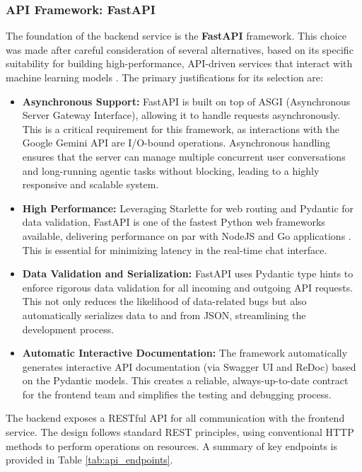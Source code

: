 \subsubsection{API Framework: FastAPI}
\label{sec:api_framework}

The foundation of the backend service is the \textbf{FastAPI} framework. This choice was made after careful consideration of several alternatives, based on its specific suitability for building high-performance, API-driven services that interact with machine learning models \cite{ramirez2023fastapi, tiangolo2022fastapi}. The primary justifications for its selection are:

\begin{itemize}
    \item \textbf{Asynchronous Support:} FastAPI is built on top of ASGI (Asynchronous Server Gateway Interface), allowing it to handle requests asynchronously. This is a critical requirement for this framework, as interactions with the Google Gemini API are I/O-bound operations. Asynchronous handling ensures that the server can manage multiple concurrent user conversations and long-running agentic tasks without blocking, leading to a highly responsive and scalable system.
    \item \textbf{High Performance:} Leveraging Starlette for web routing and Pydantic for data validation, FastAPI is one of the fastest Python web frameworks available, delivering performance on par with NodeJS and Go applications \cite{ramirez2023fastapi, tiangolo2022fastapi}. This is essential for minimizing latency in the real-time chat interface.
    \item \textbf{Data Validation and Serialization:} FastAPI uses Pydantic type hints to enforce rigorous data validation for all incoming and outgoing API requests. This not only reduces the likelihood of data-related bugs but also automatically serializes data to and from JSON, streamlining the development process.
    \item \textbf{Automatic Interactive Documentation:} The framework automatically generates interactive API documentation (via Swagger UI and ReDoc) based on the Pydantic models. This creates a reliable, always-up-to-date contract for the frontend team and simplifies the testing and debugging process.
\end{itemize}

The backend exposes a RESTful API for all communication with the frontend service. The design follows standard REST principles, using conventional HTTP methods to perform operations on resources. A summary of key endpoints is provided in Table \ref{tab:api_endpoints}.


